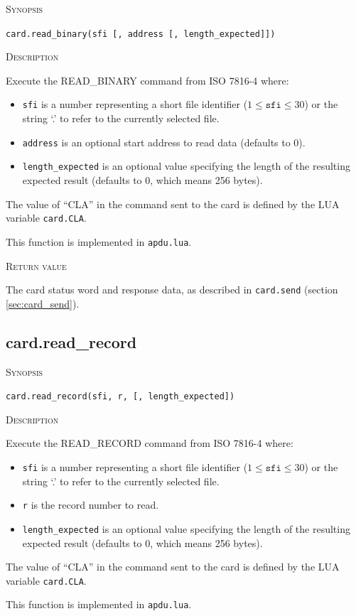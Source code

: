 \documentclass[11pt]{report}
\newcommand{\mansection}[1]{\vspace{0.5em}\par\noindent\textsc{#1}\vspace{0.5em}\par}
\newcommand{\syn}[1]{\texttt{#1}}
\begin{document}
\mansection{Synopsis}
\syn{card.read\_binary(sfi [, address [, length\_expected]])}


\mansection{Description}
  Execute the READ\_BINARY command from ISO 7816-4 where:
  \begin{itemize}
  \item{\syn{sfi} is a number representing a short file identifier ($1 \le \syn{sfi} \le 30$) or the string `.' to refer to the currently selected file.}
  \item{\syn{address} is an optional start address to read data (defaults to 0).}
  \item{\syn{length\_expected} is an optional value specifying the length of the resulting expected result (defaults to 0, which means 256 bytes).}
  \end{itemize}

  The value of ``CLA'' in the command sent to the card is defined by the LUA variable \syn{card.CLA}.

  This function is implemented in \syn{apdu.lua}.

\mansection{Return value}
  The card status word and response data, as described in \syn{card.send} (section \ref{sec:card_send}).


\subsection{card.read\_record}

\mansection{Synopsis}
\syn{card.read\_record(sfi, r, [, length\_expected])}


\mansection{Description}
  Execute the READ\_RECORD command from ISO 7816-4 where:
  \begin{itemize}
  \item{\syn{sfi} is a number representing a short file identifier ($1 \le \syn{sfi} \le 30$) or the string `.' to refer to the currently selected file.}
  \item{\syn{r} is the record number to read.}
  \item{\syn{length\_expected} is an optional value specifying the length of the resulting expected result (defaults to 0, which means 256 bytes).}
  \end{itemize}

  The value of ``CLA'' in the command sent to the card is defined by the LUA variable \syn{card.CLA}.

  This function is implemented in \syn{apdu.lua}.
\end{document}
